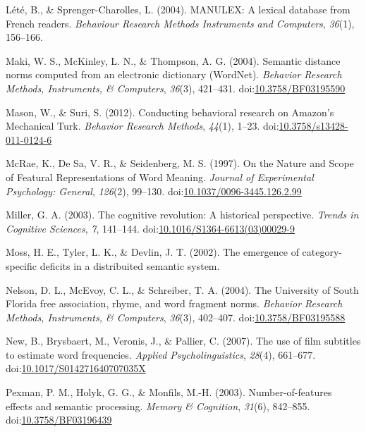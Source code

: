 \documentclass[english,man]{apa6}
\theoremstyle{definition}
\theoremstyle{definition}
\theoremstyle{definition}
\theoremstyle{remark}
\begin{document}
\hypertarget{ref-Lete2004}{}
Lété, B., \& Sprenger-Charolles, L. (2004). MANULEX: A lexical database
from French readers. \emph{Behaviour Research Methods Instruments and
Computers}, \emph{36}(1), 156--166.

\hypertarget{ref-Maki2004}{}
Maki, W. S., McKinley, L. N., \& Thompson, A. G. (2004). Semantic
distance norms computed from an electronic dictionary (WordNet).
\emph{Behavior Research Methods, Instruments, \& Computers},
\emph{36}(3), 421--431.
doi:\href{https://doi.org/10.3758/BF03195590}{10.3758/BF03195590}

\hypertarget{ref-Mason2012}{}
Mason, W., \& Suri, S. (2012). Conducting behavioral research on
Amazon's Mechanical Turk. \emph{Behavior Research Methods},
\emph{44}(1), 1--23.
doi:\href{https://doi.org/10.3758/s13428-011-0124-6}{10.3758/s13428-011-0124-6}

\hypertarget{ref-McRae1997}{}
McRae, K., De Sa, V. R., \& Seidenberg, M. S. (1997). On the Nature and
Scope of Featural Representations of Word Meaning. \emph{Journal of
Experimental Psychology: General}, \emph{126}(2), 99--130.
doi:\href{https://doi.org/10.1037/0096-3445.126.2.99}{10.1037/0096-3445.126.2.99}

\hypertarget{ref-Miller2003}{}
Miller, G. A. (2003). The cognitive revolution: A historical
perspective. \emph{Trends in Cognitive Sciences}, \emph{7}, 141--144.
doi:\href{https://doi.org/10.1016/S1364-6613(03)00029-9}{10.1016/S1364-6613(03)00029-9}

\hypertarget{ref-Moss2002}{}
Moss, H. E., Tyler, L. K., \& Devlin, J. T. (2002). The emergence of
category-specific deficits in a distribuited semantic system.

\hypertarget{ref-Nelson2004}{}
Nelson, D. L., McEvoy, C. L., \& Schreiber, T. A. (2004). The University
of South Florida free association, rhyme, and word fragment norms.
\emph{Behavior Research Methods, Instruments, \& Computers},
\emph{36}(3), 402--407.
doi:\href{https://doi.org/10.3758/BF03195588}{10.3758/BF03195588}

\hypertarget{ref-New2007}{}
New, B., Brysbaert, M., Veronis, J., \& Pallier, C. (2007). The use of
film subtitles to estimate word frequencies. \emph{Applied
Psycholinguistics}, \emph{28}(4), 661--677.
doi:\href{https://doi.org/10.1017/S014271640707035X}{10.1017/S014271640707035X}

\hypertarget{ref-Pexman2003}{}
Pexman, P. M., Holyk, G. G., \& Monfils, M.-H. (2003).
Number-of-features effects and semantic processing. \emph{Memory \&
Cognition}, \emph{31}(6), 842--855.
doi:\href{https://doi.org/10.3758/BF03196439}{10.3758/BF03196439}
\end{document}
